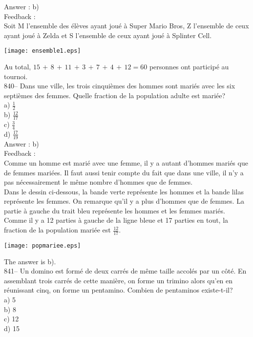 \documentclass[letterpaper, 12pt]{article}
\begin{document}
Answer : b)\\

Feedback : \\
Soit M l'ensemble des \'el\`eves ayant jou\'e \`a Super Mario Bros,
Z l'ensemble de ceux ayant jou\'e \`a Zelda et S l'ensemble de ceux ayant
jou\'e \`a Splinter Cell.\\
    \begin{center}
    \texttt{[image: ensemble1.eps]}
    \end{center}
Au total, $15\,+\,8\,+\,11\,+\,3\,+\,7\,+\,4\,+\,12=60$ personnes ont
particip\'e au tournoi.\\

840-- Dans une ville, les trois cinqui\`emes des hommes sont mari\'es avec
les six septi\`emes des femmes.  Quelle fraction de la population adulte est
mari\'ee?\\
a) $\frac{1}{2}$\\ [2mm]
b) $\frac{12}{17}$\\[2mm]
c) $\frac{3}{4}$\\ [2mm]
d) $\frac{17}{19}$\\

Answer : b)\\

Feedback : \\
Comme un homme est mari\'e avec une femme, il y a autant d'hommes mari\'es
que de femmes mari\'ees.  Il faut aussi tenir compte du fait que dans une
ville, il n'y a pas n\'ecessairement le m\^eme nombre d'hommes que de
femmes.\\
Dans le dessin ci-dessous, la bande verte repr\'esente les hommes et la
bande lilas repr\'esente les femmes.  On remarque qu'il y a plus d'hommes
que de femmes.  La partie \`a gauche du trait bleu repr\'esente les hommes
et les femmes mari\'es.  Comme il y a 12 parties \`a gauche de la ligne
bleue et 17 parties en tout, la fraction de la population mari\'ee est
$\frac{12}{17}$.
    \begin{center}
    \texttt{[image: popmariee.eps]}
    \end{center}

The answer is b).\\

841-- Un domino est form\'e de deux carr\'es de m\^eme taille accol\'es par
un c\^ot\'e.  En assemblant trois carr\'es de cette mani\`ere, on forme un
trimino alors qu'en en r\'eunissant cinq, on forme un pentamino.  Combien de
pentaminos existe-t-il?\\
a) 5\\
b) 8\\
c) 12\\
d) 15\\
\end{document}
